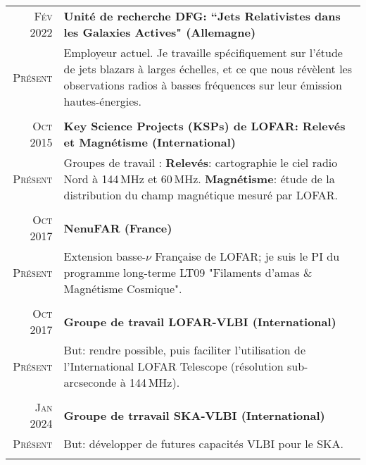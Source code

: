 \begin{tabular}{r|p{15.5cm}}
	
	\textsc{F\'ev 2022} & \textbf{Unit\'e de recherche DFG: ``Jets Relativistes dans les Galaxies Actives" (Allemagne)}\\
	\textsc{Pr\'esent}  & Employeur actuel. Je travaille sp\'ecifiquement sur l'\'etude de jets blazars \`a larges \'echelles, et ce que nous r\'ev\`elent les observations radios \`a basses fr\'equences sur leur \'emission hautes-\'energies.\\
	\multicolumn{2}{c}{} \\

	
\textsc{Oct 2015} & \textbf{Key Science Projects (KSPs) de LOFAR: Relev\'es et Magn\'etisme (International)}\\
\textsc{Pr\'esent}  &  Groupes de travail : \textbf{Relev\'es}: cartographie le ciel radio Nord \`a 144\,MHz et 60\,MHz. \textbf{Magn\'etisme}: \'etude de la distribution du champ magn\'etique mesur\'e par LOFAR.\\
\multicolumn{2}{c}{} \\

	\textsc{Oct 2017} & \textbf{NenuFAR (France)}\\
	\textsc{Pr\'esent}  & Extension basse-$\nu$ Fran\c{c}aise de LOFAR; je suis le PI du programme long-terme LT09 "Filaments d'amas \& Magn\'etisme Cosmique".\\
	\multicolumn{2}{c}{} \\
	
	\textsc{Oct 2017} & \textbf{Groupe de travail LOFAR-VLBI (International)}\\
	\textsc{Pr\'esent}  &  But: rendre possible, puis faciliter l'utilisation de l'International LOFAR Telescope (r\'esolution sub-arcseconde \`a 144\,MHz).\\
	\multicolumn{2}{c}{} \\
	
	\textsc{Jan 2024} & \textbf{Groupe de trravail SKA-VLBI (International)}\\
	\textsc{Pr\'esent}  &  But: d\'evelopper de futures capacit\'es VLBI pour le SKA.\\
	\multicolumn{2}{c}{} \\
	

	
\end{tabular}


